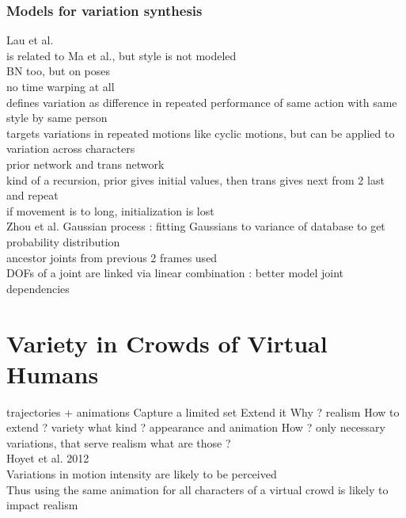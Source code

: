 \documentclass[11pt]{sdm}
\begin{document}
\subsubsection{Models for variation synthesis}
Lau et al. \cite{lau2009modeling}\\
is related to Ma et al., but style is not modeled\\
BN too, but on poses\\
no time warping at all\\
defines variation as difference in repeated performance of same action with same style by same person\\
targets variations in repeated motions like cyclic motions, but can be applied to variation across characters \\
prior network and trans network \\
kind of a recursion, prior gives initial values, then trans gives next from 2 last and repeat\\
if movement is to long, initialization is lost\\

Zhou et al. \cite{zhou2014human}
Gaussian process : fitting Gaussians to variance of database to get probability distribution\\
ancestor joints from previous 2 frames used\\
DOFs of a joint are linked via linear combination : better model joint dependencies\\

\section{Variety in Crowds of Virtual Humans}

trajectories + animations
Capture a limited set
Extend it 
Why ?
realism
How to extend ?
variety
what kind ?
appearance and animation
How ?
only necessary variations, that serve realism
what are those ?\\
Hoyet et al. 2012 \cite{hoyet2012push}\\
Variations in motion intensity are likely to be perceived\\
Thus using the same animation for all characters of a virtual crowd is likely to impact realism\\
\end{document}
